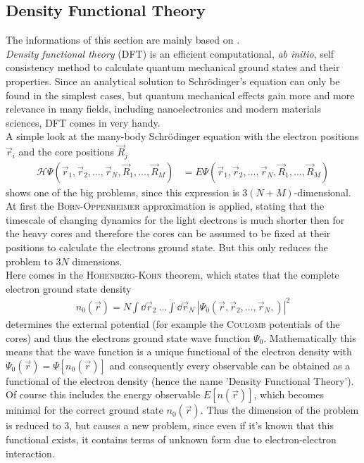 \subsection{Density Functional Theory}
The informations of this section are mainly based on \cite{KOSKINEN2009237,1402-4896-2004-T109-001}.\\
\emph{Density functional theory} (DFT) is an efficient computational, \emph{ab initio}, self consistency method to calculate quantum mechanical ground states and their properties. Since an analytical solution to Schrödinger's equation can only be found in the simplest cases, but quantum mechanical effects gain more and more relevance in many fields, including nanoelectronics and modern materials sciences, DFT comes in very handy.\\
A simple look at the many-body Schrödinger equation with the electron positions $\vec{r}_i$ and the core positions $\vec{R}_j$
\begin{align}
	\mathcal{H} \Psi\left(\vec{r}_1,\vec{r}_2,\dots,\vec{r}_N,\vec{R}_1,\dots,\vec{R}_M\right) &= E \Psi\left(\vec{r}_1,\vec{r}_2,\dots,\vec{r}_N,\vec{R}_1,\dots,\vec{R}_M\right)
\end{align}
shows one of the big problems, since this expression is $3(N+M)$-dimensional.
At first the \textsc{Born-Oppenheimer} approximation is applied, stating that the timescale of changing dynamics for the light electrons is much shorter then for the heavy cores and therefore the cores can be assumed to be fixed at their positions to calculate the electrons ground state. But this only reduces the problem to $3N$ dimensions.\\
Here comes in the \textsc{Hohenberg-Kohn} theorem, which states that the complete electron ground state density
\begin{align}
n_0\left(\vec{r}\right) = N\int\dd\vec{r}_2\ \dots\int\dd\vec{r}_N\ \left|\Psi_0\left(\vec{r}, \vec{r}_2, \dots,\vec{r}_N,\right)\right|^2
\end{align}
determines the external potential (for example the \textsc{Coulomb} potentials of the cores) and thus the electrons ground state wave function $\Psi_0$. Mathematically this means that the wave function is a unique functional of the electron density with $\Psi_0\left(\vec{r}\right) = \Psi\left[n_0\left(\vec{r}\right)\right]$ and consequently every observable can be obtained as a functional of the electron density (hence the name 'Density Functional Theory').\\
Of course this includes the energy observable $E[n\left(\vec{r}\right)]$, which becomes minimal for the correct ground state $n_0\left(\vec{r}\right)$. Thus the dimension of the problem is reduced to $3$, but causes a new problem, since even if it's known that this functional exists, it contains terms of unknown form due to electron-electron interaction.\\
